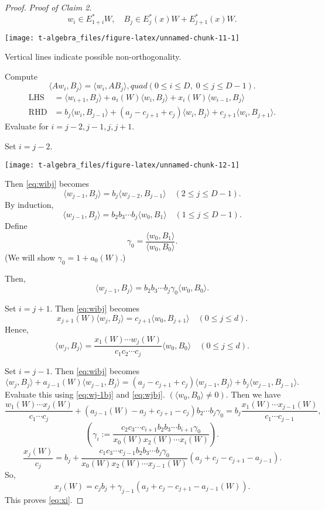 \documentclass[
]{book}
\theoremstyle{definition}
\theoremstyle{definition}
\theoremstyle{definition}
\theoremstyle{definition}
\theoremstyle{remark}
\begin{document}
\begin{proof}
\emph{Proof of Claim 2.}
\[w_i\in E^*_{1+i}W, \quad B_j\in E^*_j(x)W + E^*_{j+1}(x)W.\]

\begin{center}\texttt{[image: t-algebra\_files/figure-latex/unnamed-chunk-11-1]} \end{center}

Vertical lines indicate possible non-orthogonality.

Compute
\begin{equation}
\langle Aw_i, B_j\rangle = \langle w_i, AB_j\rangle, quad (0\leq i\leq D, \; 0\leq j\leq D-1).\label{eq:wibj}
\end{equation}
\begin{align}
\text{LHS} & = \langle w_{i+1},B_j\rangle + a_i(W)\langle w_i,B_j\rangle + x_i(W)\langle w_{i-1},B_j\rangle\\
\text{RHD}& = b_j\langle w_i, B_{j-1}\rangle + (a_j-c_{j+1}+c_j)\langle w_i, B_j\rangle + c_{j+1}\langle w_i, B_{j+1}\rangle.
\end{align}
Evaluate for \(i = j-2, j-1, j, j+1\).

Set \(i = j-2\).

\begin{center}\texttt{[image: t-algebra\_files/figure-latex/unnamed-chunk-12-1]} \end{center}

Then \eqref{eq:wibj} becomes
\[\langle w_{j-1}, B_j\rangle = b_j\langle w_{j-2},B_{j-1}\rangle \quad (2\leq j\leq D-1).\]
By induction,
\[\langle w_{j-1}, B_j\rangle = b_2b_3\cdots b_j\langle w_{0},B_{1}\rangle \quad (1\leq j\leq D-1).\]
Define
\[\gamma_0 = \frac{\langle w_0, B_1\rangle}{\langle w_0, B_0\rangle}.\]
(We will show \(\gamma_0 = 1+a_0(W)\).)

Then,
\begin{equation}
\langle w_{j-1},B_j\rangle = b_2b_3\cdots b_j\gamma_0\langle w_0, B_0\rangle. \label{eq:wj-1bj}
\end{equation}

Set \(i = j+1\).
Then \eqref{eq:wibj} becomes
\[x_{j+1}(W)\langle w_j, B_j\rangle = c_{j+1}\langle w_0, B_{j+1}\rangle \quad (0\leq j\leq d).\]
Hence,
\begin{equation}
\langle w_j, B_j\rangle = \frac{x_1(W)\cdots w_j(W)}{c_1c_2\cdots c_j}\langle w_0, B_0\rangle \quad (0\leq j\leq d). \label{eq:wjbj}
\end{equation}

Set \(i = j-1\).
Then \eqref{eq:wibj} becomes
\[
\langle w_j, B_j\rangle + a_{j-1}(W)\langle w_{j-1}, B_j\rangle
 = (a_j-c_{j+1}+c_j)\langle w_{j-1},B_j\rangle + b_j\langle w_{j-1},B_{j-1}\rangle.
\]
Evaluate this using \eqref{eq:wj-1bj} and \eqref{eq:wjbj}. \((\langle w_0, B_0\rangle \neq 0)\). Then we have
\[\frac{w_1(W)\cdots x_j(W)}{c_1\cdots c_j}+(a_{j-1}(W)-a_j+c_{j+1}-c_j)b_2\cdots b_j\gamma_0 = b_j\frac{x_1(W)\cdots x_{j-1}(W)}{c_1\cdots c_{j-1}},\]
\[\left(\gamma_i:=\frac{c_2c_3\cdots c_{i+1}b_2b_3\cdots b_{i+1}\gamma_0}{x_0(W)x_2(W)\cdots x_i(W)} \right).\]
\[\frac{x_j(W)}{c_j}  = b_j + \frac{c_1c_3\cdots c_{j-1}b_2b_3\cdots b_{j}\gamma_0}{x_0(W)x_2(W)\cdots x_{j-1}(W)}(a_j+c_j-c_{j+1}-a_{j-1}).\]
So,
\[x_j(W)  = c_jb_j + \gamma_{j-1}(a_j+c_j-c_{j+1}-a_{j-1}(W)).\]
This proves \eqref{eq:xi}.


\end{proof}
\end{document}
